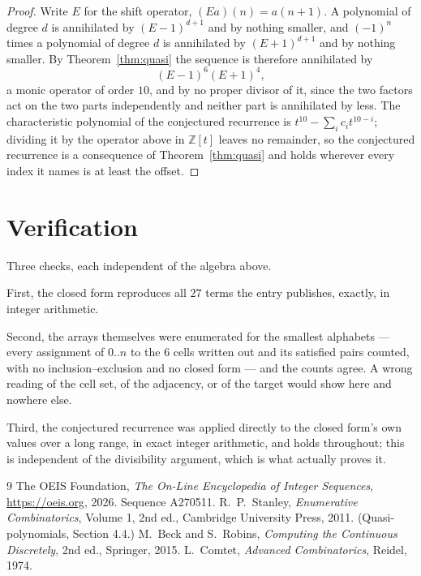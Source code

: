 \documentclass[11pt,a4paper]{article}
\theoremstyle{plain}
\theoremstyle{definition}
\begin{document}
\begin{proof}
Write $E$ for the shift operator, $(Ea)(n)=a(n+1)$. A polynomial of degree $d$ is annihilated
by $(E-1)^{d+1}$ and by nothing smaller, and $(-1)^n$ times a polynomial of degree $d$ is
annihilated by $(E+1)^{d+1}$ and by nothing smaller. By Theorem~\ref{thm:quasi} the
sequence is therefore annihilated by
\[
(E-1)^{6}(E+1)^{4},
\]
a monic operator of order $10$, and by no proper divisor of it, since the two
factors act on the two parts independently and neither part is annihilated by less. The
characteristic polynomial of the conjectured recurrence is
$t^{10}-\sum_i c_it^{10-i}$; dividing it by the operator above in
$\mathbb{Z}[t]$ leaves no remainder, so the conjectured recurrence is a consequence of
Theorem~\ref{thm:quasi} and holds wherever every index it names is at least the offset.
\end{proof}

\section{Verification}

Three checks, each independent of the algebra above.

First, the closed form reproduces all $27$ terms the entry publishes, exactly, in integer
arithmetic.

Second, the arrays themselves were enumerated for the smallest alphabets --- every assignment
of $0..n$ to the $6$ cells written out and its satisfied pairs counted, with no
inclusion--exclusion and no closed form --- and the counts agree. A wrong reading of the cell
set, of the adjacency, or of the target would show here and nowhere else.

Third, the conjectured recurrence was applied directly to the closed form's own values over a
long range, in exact integer arithmetic, and holds throughout; this is independent of the
divisibility argument, which is what actually proves it.

\begin{thebibliography}{9}
 The OEIS Foundation, \emph{The On-Line Encyclopedia of Integer
Sequences}, \url{https://oeis.org}, 2026. Sequence A270511.
 R.~P.~Stanley, \emph{Enumerative Combinatorics}, Volume 1, 2nd ed.,
Cambridge University Press, 2011. (Quasi-polynomials, Section 4.4.)
 M.~Beck and S.~Robins, \emph{Computing the Continuous Discretely}, 2nd ed.,
Springer, 2015.
 L.~Comtet, \emph{Advanced Combinatorics}, Reidel, 1974.
\end{thebibliography}
\end{document}
